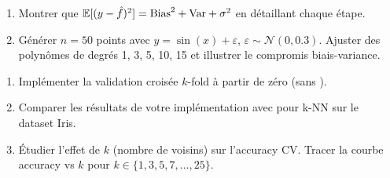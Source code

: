\begin{exercice}
\begin{enumerate}
  \item Montrer que $\mathbb{E}[(y - \hat{f})^2] = \mathrm{Bias}^2 + \mathrm{Var} + \sigma^2$ en
    d\'etaillant chaque \'etape.
  \item G\'en\'erer $n = 50$ points avec $y = \sin(x) + \varepsilon$,
    $\varepsilon \sim \mathcal{N}(0, 0.3)$. Ajuster des polyn\^omes de
    degr\'es 1, 3, 5, 10, 15 et illustrer le compromis biais-variance.
\end{enumerate}
\end{exercice}

\begin{exercice}
\begin{enumerate}
  \item Impl\'ementer la validation crois\'ee $k$-fold \`a partir de z\'ero
    (sans ).
  \item Comparer les r\'esultats de votre impl\'ementation avec
     pour k-NN sur le dataset Iris.
  \item \'Etudier l'effet de $k$ (nombre de voisins) sur l'accuracy CV.
    Tracer la courbe accuracy vs $k$ pour $k \in \{1, 3, 5, 7, \ldots, 25\}$.
\end{enumerate}
\end{exercice}
